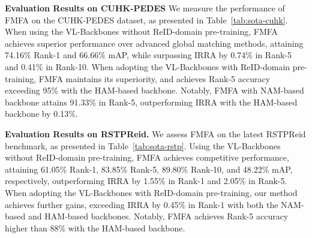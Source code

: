 \documentclass[acmsmall]{acmart}
\begin{document}
{\bfseries Evaluation Results on CUHK-PEDES} We measure the
performance of FMFA on the CUHK-PEDES dataset, as presented in
Table~\ref{tab:sota-cuhk}. When using the VL-Backbones without
ReID-domain pre-training, FMFA achieves superior performance over
advanced global matching methods, attaining 74.16\% Rank-1 and
66.66\% mAP, while surpassing IRRA by 0.74\% in Rank-5 and 0.41\% in
Rank-10. When adopting the VL-Backbones with ReID-domain
pre-training, FMFA maintains its superiority, and achieves Rank-5
accuracy exceeding 95\% with the HAM-based backbone. Notably, FMFA
with NAM-based backbone attains 91.33\% in Rank-5, outperforming
IRRA with the HAM-based backbone by 0.13\%.

{\bfseries Evaluation Results on RSTPReid.} We assess FMFA on the
latest RSTPReid benchmark, as presented in
Table~\ref{tab:sota-rstp}. Using the VL-Backbones without
ReID-domain pre-training, FMFA achieves competitive performance,
attaining 61.05\% Rank-1, 83.85\% Rank-5, 89.80\% Rank-10, and
48.22\% mAP, respectively, outperforming IRRA by 1.55\% in Rank-1
and 2.05\% in Rank-5. When adopting the VL-Backbones with
ReID-domain pre-training, our method achieves further gains,
exceeding IRRA by 0.45\% in Rank-1 with both the NAM-based and
HAM-based backbones. Notably, FMFA achieves Rank-5 accuracy higher
than 88\% with the HAM-based backbone.
\end{document}
